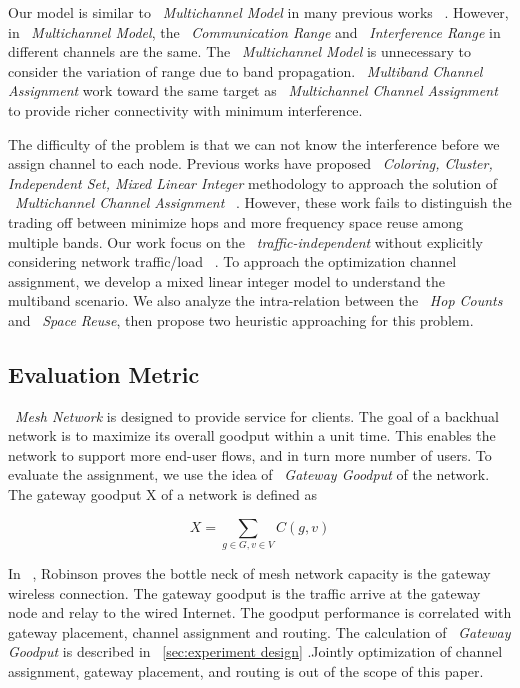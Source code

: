 Our model is similar to ~\emph{Multichannel Model} in many previous works ~\cite{tang2005interference,yuan2006cross,si2010overview}. However, in ~\emph{Multichannel Model}, the ~\emph{Communication Range} and ~\emph{Interference Range} in different channels are the same. The ~\emph{Multichannel Model} is unnecessary to consider the variation of range due to band propagation.
~\emph{Multiband Channel Assignment} work toward the same target as ~\emph{Multichannel Channel Assignment} to provide richer connectivity with minimum interference.

The difficulty of the problem is that we can not know the interference before we assign channel to each node. Previous works have proposed ~\emph{Coloring, Cluster, Independent Set, Mixed Linear Integer} methodology to approach the solution of ~\emph{Multichannel Channel Assignment} ~\cite{mishra2005weighted,peng2012efficient,tang2005interference}. 
However, these work fails to distinguish the trading off between minimize hops and more frequency space reuse among multiple bands.
Our work focus on the ~\emph{traffic-independent} 
without explicitly considering network traffic/load ~\cite{marina2010topology}.
To approach the optimization channel assignment, we develop a mixed linear integer model to understand the multiband scenario. We also analyze the intra-relation between the ~\emph{Hop Counts} and ~\emph{Space Reuse}, then propose two heuristic approaching for this problem.

\subsection{Evaluation Metric}
\label{subsec:metric}
~\emph{Mesh Network} is designed to provide service for clients. The goal of a backhual network is to maximize its overall goodput within a unit time. 
This enables the network to support more end-user flows, and in turn more number of users. To evaluate the assignment, we use the idea of ~\emph{Gateway Goodput} of the network. The gateway goodput X of a network is defined as

\begin{equation}
\label{eq:goodput}
X=\sum_{g \in G, v \in V}C(g,v)
\end{equation}

In ~\cite{robinson2008adding}, Robinson proves the bottle neck of mesh network capacity is the gateway wireless connection. 
The gateway goodput is the traffic arrive at the gateway node and relay to the wired Internet. The goodput performance is correlated with gateway placement, channel assignment and routing. 
The calculation of ~\emph{Gateway Goodput} is described in ~\ref{sec:experiment design} .Jointly optimization of channel assignment, gateway placement, and routing is out of the scope of this paper.

